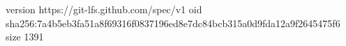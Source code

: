 version https://git-lfs.github.com/spec/v1
oid sha256:7a4b5eb3fa51a8f69316f0837196ed8e7dc84bcb315a0d9fda12a9f2645475f6
size 1391
